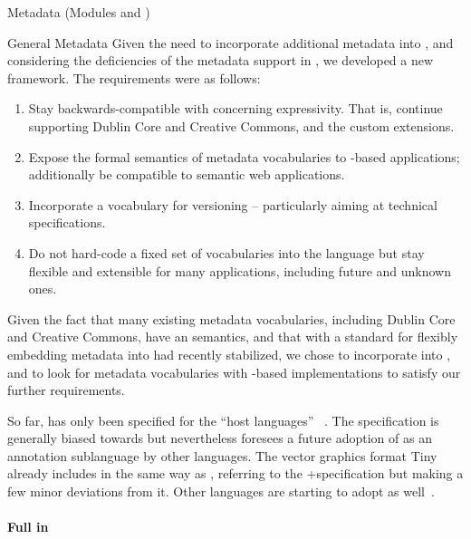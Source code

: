 \begin{tchapter}[id=metadata,short=Metadata]{Metadata (Modules {} and  {})}
\begin{tsection}{General Metadata}
Given the need to incorporate additional metadata into \omdoc, and considering the deficiencies of the metadata support in , we developed a new framework.  The requirements were as follows:

\begin{enumerate}
\item Stay backwards-compatible with  concerning expressivity.  That is,
  continue supporting Dublin Core and Creative Commons, and the custom extensions.
\item Expose the formal semantics of metadata vocabularies to \omdoc-based applications;
  additionally be compatible to semantic web applications.
\item Incorporate a vocabulary for versioning -- particularly aiming at technical
  specifications.
\item Do not hard-code a fixed set of vocabularies into the language but stay flexible and
  extensible for many applications, including future and unknown ones.
\end{enumerate}

Given the fact that many existing metadata vocabularies, including
Dublin Core and Creative Commons, have an \rdf semantics,
and that with \rdfa{} a standard for flexibly embedding metadata into \xml had recently stabilized, we chose to incorporate \rdfa into \omdoc, and to look for metadata vocabularies with \rdf-based implementations to satisfy our further requirements.

So far, \rdfa has only been specified for the \enquote{host languages} \xhtml~\cite{AdidaEtAl08:RDFa}.  The specification is generally biased towards \xhtml but nevertheless foresees a future adoption of \rdfa as an annotation sublanguage by other \xml languages.  The vector graphics format \svg Tiny already includes \rdfa in the same way as \xhtml, referring to the \xhtml+\rdfa specification but making a few minor deviations from it.  Other languages are starting to adopt \rdfa as well~\cite{RDFaHostLanguages}.

\paragraph{Full \rdfa in \omdoc}
\label{sec:new-metadata-rdfa}


\end{tsection}
\end{tchapter}
